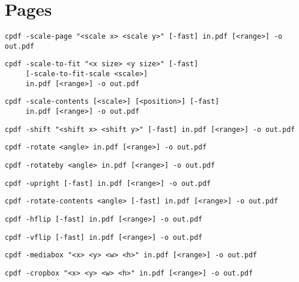 \documentclass{book}
\begin{document}
\chapter{Pages}\label{chap:3}
\pagestyle{fancy}
  \label{pages}
  \begin{framed}
  \small\noindent\verb!cpdf -scale-page "<scale x> <scale y>" [-fast] in.pdf [<range>] -o out.pdf!
   
  \vspace{1.5mm}
  \small\noindent\verb!cpdf -scale-to-fit "<x size> <y size>" [-fast]!\\
        \noindent\verb!     [-scale-to-fit-scale <scale>]!\\    
        \noindent\verb!     in.pdf [<range>] -o out.pdf!

  \vspace{1.5mm}
  \small\noindent\verb!cpdf -scale-contents [<scale>] [<position>] [-fast]!\\
        \noindent\verb!     in.pdf [<range>] -o out.pdf!
  
  \vspace{1.5mm}
  \small\noindent\verb!cpdf -shift "<shift x> <shift y>" [-fast] in.pdf [<range>] -o out.pdf!

  \vspace{1.5mm}
  \small\noindent\verb!cpdf -rotate <angle> in.pdf [<range>] -o out.pdf!

  \vspace{1.5mm}
  \small\noindent\verb!cpdf -rotateby <angle> in.pdf [<range>] -o out.pdf!

  \vspace{1.5mm}
  \small\noindent\verb!cpdf -upright [-fast] in.pdf [<range>] -o out.pdf!

  \vspace{1.5mm}
  \small\noindent\verb!cpdf -rotate-contents <angle> [-fast] in.pdf [<range>] -o out.pdf!


  \vspace{1.5mm}
  \small\noindent\verb!cpdf -hflip [-fast] in.pdf [<range>] -o out.pdf!

  \vspace{1.5mm}
  \small\noindent\verb!cpdf -vflip [-fast] in.pdf [<range>] -o out.pdf!
  
  \vspace{1.5mm}
  \small\noindent\verb!cpdf -mediabox "<x> <y> <w> <h>" in.pdf [<range>] -o out.pdf!


  \vspace{1.5mm}
  \small\noindent\verb!cpdf -cropbox "<x> <y> <w> <h>" in.pdf [<range>] -o out.pdf!


\end{framed}
\end{document}
